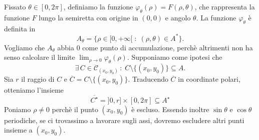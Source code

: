 \documentclass{article}
\theoremstyle{plain}
\theoremstyle{definition}
\theoremstyle{remark}
\begin{document}
Fissato $\theta\in[0,2\pi]$, definiamo la funzione $\varphi_\theta(\rho)=F(\rho,\theta)$, che rappresenta la funzione \(F\) lungo la semiretta con origine in \((0,0)\) e angolo \(\theta\).
La funzione \(\varphi_\theta\) è definita in 
\[A_\theta=\{\rho\in[0,+\infty[\;:\;(\rho,\theta)\in A^*\}.\]
Vogliamo che $A_\theta$ abbia $0$ come punto di accumulazione, perchè altrimenti non ha senso calcolare il limite \(\lim_{\rho\to0}\varphi_\theta(\rho)\).
Supponiamo come ipotesi che 
\[\exists\,C\in\mathcal{C}_{(x_0,y_0)}\,:\;C\setminus\{(x_0,y_0)\}\subseteq A.\]
Sia $r$ il raggio di $C$ e $\overline{C}=C\setminus\{(x_0,y_0)\}$.
Traducendo $\overline{C}$ in coordinate polari, otteniamo l'insieme 
\[\overline{C^\star}=]0,r]\times[0,2\pi]\subseteq A^\star\]
Poniamo $\rho\neq 0$ perchè il punto $(x_0,y_0)$ è escluso. Essendo inoltre $\sin\theta$ e $\cos\theta$ periodiche, se ci trovassimo a lavorare sugli assi, dovremo escludere altri punti insieme a $(x_0,y_0)$.

\vspace{10pt}
\end{document}
